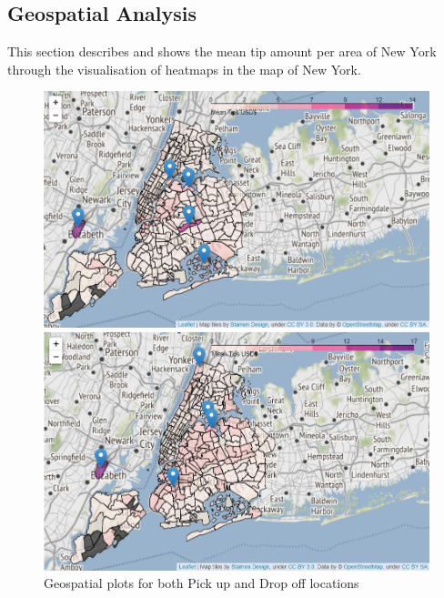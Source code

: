 \documentclass[11pt]{article}
\begin{document}
\subsection{Geospatial Analysis}
This section describes and shows the mean tip amount per area of New York through the visualisation of heatmaps in the map of New York. 

\begin{figure}[t]
    \centering
    \begin{minipage}[t]{0.45\textwidth}
        \centering
        \includegraphics[height = 8 cm, width = 9 cm]{plots/Geoplot_PU_tip.png}
    \end{minipage}
    \hfill
    \begin{minipage}[t]{0.45\textwidth}
        \centering
        \includegraphics[height = 8 cm, width = 9 cm]{plots/Geoplot_DO_tip.png}
    \end{minipage}
    \hfill
    \caption{Geospatial plots for both Pick up and Drop off locations}
\end{figure}
\end{document}
